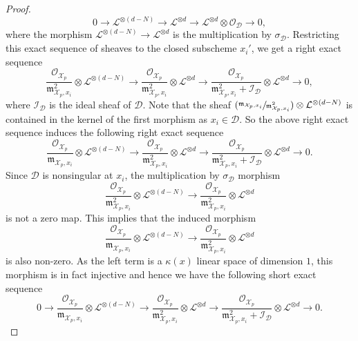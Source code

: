 \documentclass[JEP,XML,SOM,Unicode,published]{cedram}
\newcommand{\Psfrac}[2]{(\sfrac{#1}{#2})}
\theoremstyle{plain}
\theoremstyle{definition}
\newcommand{\X}{\mathcal{X}}
\newcommand{\li}{\mathcal{L}}
\begin{document}
\begin{proof}
\[
0\to \li^{\otimes (d-N)} \to \li^{\otimes d} \to \li^{\otimes d}\otimes \mathcal{O}_{\mathcal{D}}\to 0,
\]
where the morphism $\li^{\otimes (d-N)} \to \li^{\otimes d}$ is the multiplication by $\sigma_{\mathcal{D}}$. Restricting this exact sequence of sheaves to the closed subscheme $x_i'$, we get a right exact sequence\vspace*{-3pt}
\[
\frac{\mathcal{O}_{\X_p}}{\mathfrak{m}_{\X_p, x_i}^2}\otimes \li^{\otimes (d-N)} \to \frac{\mathcal{O}_{\X_p}}{\mathfrak{m}_{\X_p, x_i}^2}\otimes \li^{\otimes d}\to \frac{\mathcal{O}_{\X_p}}{\mathfrak{m}^2_{\X_p, x_i}+\mathcal{I}_{\mathcal{D}}}\otimes \li^{\otimes d}\to 0,
\]
where $\mathcal{I}_{\mathcal{D}}$ is the ideal sheaf of $\mathcal{D}$. Note that the sheaf $\Psfrac{\mathfrak{m}_{\X_p, x_i}}{\mathfrak{m}_{\X_p, x_i}^2}\otimes \li^{\otimes (d-N)}$ is contained in the kernel of the first morphism as $x_i\in \mathcal{D}$. So the above right exact sequence induces the following right exact sequence\vspace*{-3pt}
\[
\frac{\mathcal{O}_{\X_p}}{\mathfrak{m}_{\X_p, x_i}}\otimes \li^{\otimes (d-N)} \to \frac{\mathcal{O}_{\X_p}}{\mathfrak{m}_{\X_p, x_i}^2}\otimes \li^{\otimes d}\to \frac{\mathcal{O}_{\X_p}}{\mathfrak{m}^2_{\X_p, x_i}+\mathcal{I}_{\mathcal{D}}}\otimes \li^{\otimes d}\to 0.
\]
Since $\mathcal{D}$ is nonsingular at $x_i$, the multiplication by $\sigma_{\mathcal{D}}$ morphism\vspace*{-3pt}
\[
\frac{\mathcal{O}_{\X_p}}{\mathfrak{m}_{\X_p, x_i}^2}\otimes \li^{\otimes (d-N)} \to \frac{\mathcal{O}_{\X_p}}{\mathfrak{m}_{\X_p, x_i}^2}\otimes \li^{\otimes d}
\]
is not a zero map. This implies that the induced morphism\vspace*{-3pt}
\[
\frac{\mathcal{O}_{\X_p}}{\mathfrak{m}_{\X_p, x_i}}\otimes \li^{\otimes (d-N)} \to \frac{\mathcal{O}_{\X_p}}{\mathfrak{m}_{\X_p, x_i}^2}\otimes \li^{\otimes d}
\]
is also non-zero.
As the left term is a $\kappa(x)$ linear space of dimension $1$, this morphism is in fact injective and hence we have the following short exact sequence\vspace*{-3pt}
\[
0\to \frac{\mathcal{O}_{\X_p}}{\mathfrak{m}_{\X_p, x_i}}\otimes \li^{\otimes (d-N)} \to \frac{\mathcal{O}_{\X_p}}{\mathfrak{m}_{\X_p, x_i}^2}\otimes \li^{\otimes d}\to \frac{\mathcal{O}_{\X_p}}{\mathfrak{m}^2_{\X_p, x_i}+\mathcal{I}_{\mathcal{D}}}\otimes \li^{\otimes d}\to 0.
\]


\end{proof}
\end{document}
